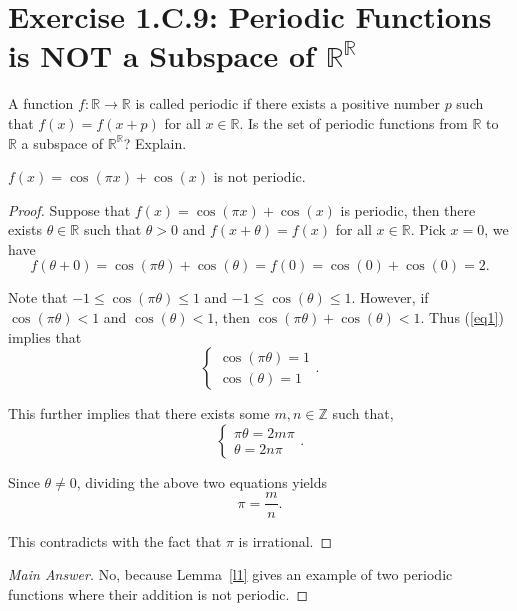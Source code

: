 \section{Exercise 1.C.9: Periodic Functions is NOT a Subspace of $\mathbb{R}^\mathbb{R}$}\label{Exercise 1.C.9}
A function $f: \mathbb{R}\to\mathbb{R}$ is called periodic if there exists a positive number $p$ such that $f(x)=f(x+p)$ for all $x\in\mathbb{R}$. Is the set of periodic functions from $\mathbb{R}$ to $\mathbb{R}$ a subspace of $\mathbb{R}^\mathbb{R}$? Explain.

\begin{lemma}\label{l1}
$f(x)=\cos(\pi x)+\cos(x)$ is not periodic.
\end{lemma}

\begin{proof}
Suppose that $f(x)=\cos(\pi x)+\cos(x)$ is periodic, then there exists $\theta\in\mathbb{R}$ such that $\theta>0$ and $f(x+\theta)=f(x)$ for all $x\in\mathbb{R}$. Pick $x=0$, we have
\begin{equation}\label{eq1}
f(\theta+0)=\cos(\pi\theta)+\cos(\theta)=f(0)=\cos(0)+\cos(0)=2.
\end{equation}

Note that $-1\leqslant \cos(\pi\theta)\leqslant 1$ and $-1\leqslant \cos(\theta)\leqslant 1$. However, if $\cos(\pi\theta)<1$ and $\cos(\theta)<1$, then $\cos(\pi\theta)+\cos(\theta)<1$. Thus (\ref{eq1}) implies that
\[
\begin{cases}
\cos(\pi\theta)=1\\
\cos(\theta)=1
\end{cases}.
\]

This further implies that there exists some $m,n\in\mathbb{Z}$ such that,
\[
\begin{cases}
\pi\theta=2m\pi\\
\theta=2n\pi
\end{cases}.
\]

Since $\theta\ne 0$, dividing the above two equations yields
\[
\pi=\frac{m}{n}.
\]

This contradicts with the fact that $\pi$ is irrational.
\end{proof}

\begin{proof}[Main Answer]
No, because Lemma~\ref{l1} gives an example of two periodic functions where their addition is not periodic.
\end{proof}

